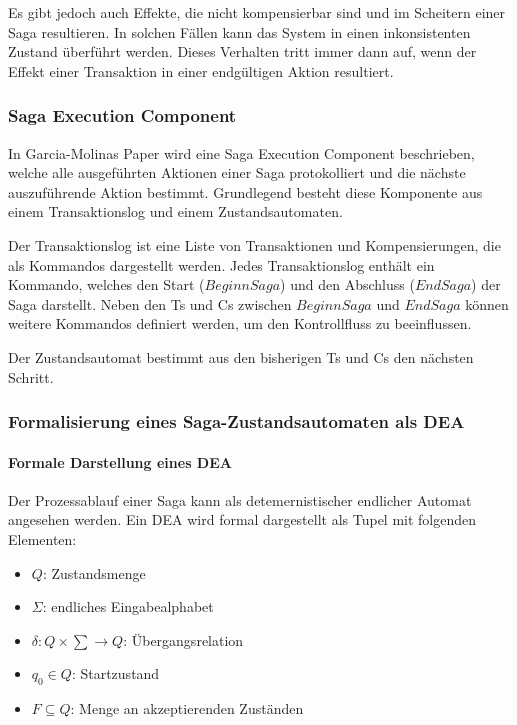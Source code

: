 Es gibt jedoch auch Effekte, die nicht kompensierbar sind und im Scheitern einer Saga resultieren. In solchen Fällen kann das System in einen inkonsistenten Zustand überführt werden. Dieses Verhalten tritt immer dann auf, wenn der Effekt einer Transaktion in einer endgültigen Aktion resultiert. %

\subsubsection{Saga Execution Component} %
In Garcia-Molinas Paper wird eine Saga Execution Component beschrieben, welche alle ausgeführten Aktionen einer Saga protokolliert und die nächste auszuführende Aktion bestimmt. Grundlegend besteht diese Komponente aus einem Transaktionslog und einem Zustandsautomaten. 

Der Transaktionslog ist eine Liste von Transaktionen und Kompensierungen, die als Kommandos dargestellt werden. Jedes Transaktionslog enthält ein Kommando, welches den Start ($Beginn Saga$) und den Abschluss ($End Saga$) der Saga darstellt. Neben den Ts und Cs zwischen $Beginn Saga$ und $End Saga$ können weitere Kommandos definiert werden, um den Kontrollfluss zu beeinflussen. 

Der Zustandsautomat bestimmt aus den bisherigen Ts und Cs den nächsten Schritt. 


\subsubsection{Formalisierung eines Saga-Zustandsautomaten als DEA} \label{sec_saga_formalisierung_dea}
\paragraph{Formale Darstellung eines DEA}
Der Prozessablauf einer Saga kann als detemernistischer endlicher Automat angesehen werden. Ein DEA wird formal dargestellt als Tupel mit folgenden Elementen:
\begin{itemize}
	\item $Q$: Zustandsmenge
	\item $\Sigma$: endliches Eingabealphabet
	\item $\delta: Q \times \sum \rightarrow Q$: Übergangsrelation 
	\item $q_0 \in Q$: Startzustand
	\item $F \subseteq Q$: Menge an akzeptierenden Zuständen
\end{itemize}

